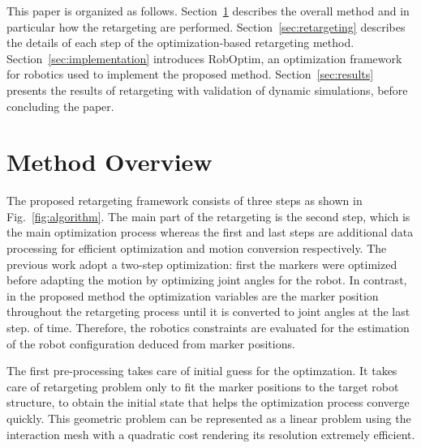 \documentclass[letterpaper, 10 pt, conference]{ieeeconf}  %
\begin{document}
This paper is organized as follows. Section~\ref{sec:overview}
describes the overall method and in particular how the retargeting
are performed. Section~\ref{sec:retargeting} describes the
details of each step of the optimization-based retargeting method.
Section~\ref{sec:implementation} introduces 
RobOptim, an optimization framework for robotics used to implement the
proposed method. Section~\ref{sec:results} presents the results of
retargeting with validation of dynamic simulations, before concluding
the paper.

\section{Method Overview}
\label{sec:overview}

The proposed retargeting framework consists of three steps as shown in
Fig.~\ref{fig:algorithm}. 
The main part of the retargeting is the second step, which is the main
optimization process whereas the first and last steps are additional
data processing for efficient optimization and motion conversion
respectively. 
The previous work \cite{Nakaoka12Humanoids} adopt a two-step optimization:
first the markers were optimized before adapting the motion by
optimizing joint angles for the robot. 
In contrast, in the proposed method the
optimization variables are the marker position throughout the
retargeting process until it is converted to joint angles at the last step.
of time. Therefore, the robotics constraints are evaluated for the
estimation of the robot configuration deduced from marker positions.


The first pre-processing takes care of initial guess for the
optimzation. It takes care of retargeting problem only to fit the
marker positions to the target robot structure, to obtain the initial
state that helps the optimization process converge quickly.
This geometric problem can be represented as a
linear problem using the interaction mesh \cite{Komura10}
with a quadratic cost rendering its resolution
extremely efficient.
\end{document}
